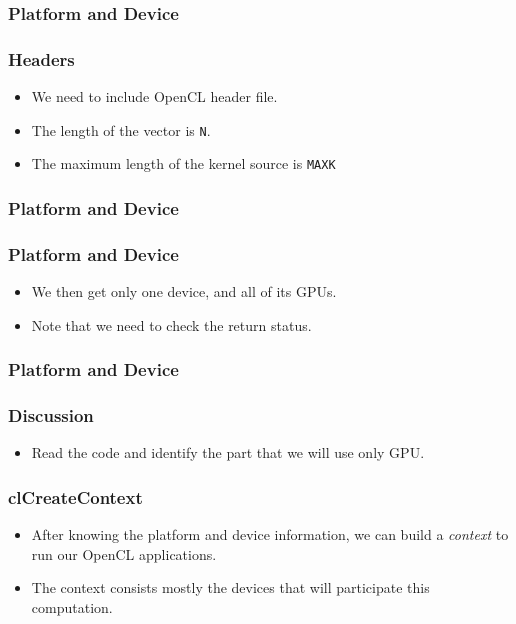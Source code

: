 \documentclass{beamer}
\begin{document}
\begin{frame}
  \frametitle{Platform and Device}
\end{frame}

\begin{frame}
  \frametitle{Headers}
  \begin{itemize}
  \item We need to include OpenCL header file.
  \item The length of the vector is {\tt N}.
  \item The maximum length of the kernel source is {\tt MAXK}
  \end{itemize}
\end{frame}

\begin{frame}
  \frametitle{Platform and Device}
\end{frame}

\begin{frame}
  \frametitle{Platform and Device}
  \begin{itemize}
  \item We then get only one device, and all of its GPUs.
  \item Note that we need to check the return status.
  \end{itemize}
\end{frame}

\begin{frame}
  \frametitle{Platform and Device}
  \centerline{}
\end{frame}

\begin{frame}
  \frametitle{Discussion}
  \begin{itemize}
  \item Read the code and identify the part that we will use only GPU.
  \end{itemize}
\end{frame}

\begin{frame}
  \frametitle{clCreateContext}
  \begin{itemize}
  \item After knowing the platform and device information, we can build
    a {\em context} to run our OpenCL applications.
  \item The context consists mostly the devices that will participate
    this computation.
  \end{itemize}
\end{frame}
\end{document}
